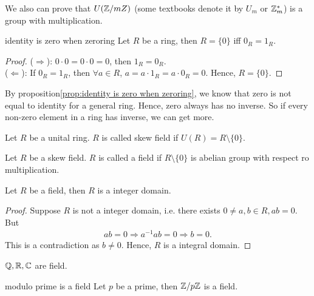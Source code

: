 We also can prove that $U(\mathbb{Z}/mZ)$ (some textbooks denote it by $U_m$ or $\mathbb{Z}_m^*$) is a group with multiplication.

\begin{proposition}{}{identity is zero when zeroring}
    Let $R$ be a ring, then 
    $R=\{0\}$ iff $0_R=1_R$.
\end{proposition}

\begin{proof}
    ($\Rightarrow$): $0\cdot 0 = 0\cdot 0=0$, then $1_R=0_R$. \\
    ($\Leftarrow$): If $0_R=1_R$, then $\forall a\in R$, $a=a\cdot 1_R=a\cdot 0_R=0$. Hence, $R=\{0\}$.  
\end{proof}

By proposition\ref{prop:identity is zero when zeroring}, 
we know that zero is not equal to identity for a general ring.
Hence, zero always has no inverse. So if every non-zero element in a ring has inverse, 
we can get more.

\begin{definition}{}{}
    Let $R$ be a unital ring. $R$ is called skew field if $U(R)=R\setminus \{0\}$. 
\end{definition}


\begin{definition}{}{}
    Let $R$ be a skew field. $R$ is called a field if $R\setminus \{0\}$ is abelian group with respect ro multiplication.
\end{definition}

\begin{proposition}{}{}
    Let $R$ be a field, then $R$ is a integer domain.
\end{proposition}
\begin{proof}
    Suppose $R$ is not a integer domain, i.e. there exists $0 \neq a,b\in R, ab=0$.
    But
    \begin{align*}
        ab = 0\Rightarrow a^{-1}ab=0\Rightarrow b=0.
    \end{align*}
    This is a contradiction as $b\neq 0$.
    Hence, $R$ is a integral domain.
\end{proof}

\begin{example}{}{}
    $\mathbb{Q},\mathbb{R},\mathbb{C}$ are field.
\end{example}

\begin{example}{}{modulo prime is a field}
    Let $p$ be a prime, then $\mathbb{Z}/p\mathbb{Z}$ is a field.
\end{example}

